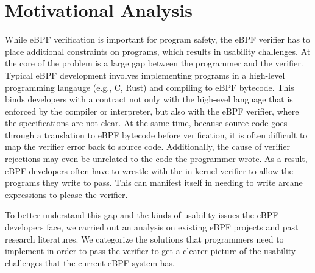 \section{Motivational Analysis}
\label{sec:motivation}

While eBPF verification is important for program safety, the eBPF verifier has
    to place additional constraints on programs, which results in usability
    challenges.
At the core of the problem is a large gap between the programmer and the
    verifier.
Typical eBPF development involves implementing programs in a high-level
    programming langauge (e.g., C, Rust) and compiling to eBPF bytecode.
This binds developers with a contract not only with the high-evel language
    that is enforced by the compiler or interpreter, but also with the eBPF
    verifier, where the specifications are not clear. 
At the same time, because source code goes through a translation to eBPF
    bytecode before verification, it is often difficult to map the verifier
    error back to source code.
Additionally, the cause of verifier rejections may even be unrelated to the code the programmer wrote.
As a result, eBPF developers often have to wrestle with the in-kernel verifier
    to allow the programs they write to pass.
This can manifest itself in needing to write arcane expressions to please the
    verifier.

To better understand this gap and the kinds of usability issues the eBPF
    developers face, we carried out an analysis on existing eBPF projects and
    past research literatures.
We categorize the solutions that programmers need to implement in order to pass the verifier to get a clearer picture of the usability challenges that the current eBPF system has.

